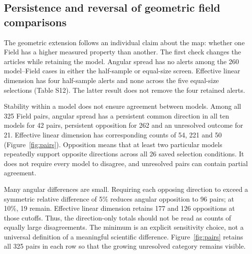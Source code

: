 \documentclass[12pt]{article}
\begin{document}
\subsection{Persistence and reversal of geometric field comparisons}
The geometric extension follows an individual claim about the map: whether one Field has a higher measured property than another. The first check changes the articles while retaining the model. Angular spread has no alerts among the 260 model--Field cases in either the half-sample or equal-size screen. Effective linear dimension has four half-sample alerts and none across the five equal-size selections (Table S12). The latter result does not remove the four retained alerts.

Stability within a model does not ensure agreement between models. Among all 325 Field pairs, angular spread has a persistent common direction in all ten models for 42 pairs, persistent opposition for 262 and an unresolved outcome for 21. Effective linear dimension has corresponding counts of 54, 221 and 50 (Figure~\ref{fig:pairs}). Opposition means that at least two particular models repeatedly support opposite directions across all 26 saved selection conditions. It does not require every model to disagree, and unresolved pairs can contain partial agreement.

Many angular differences are small. Requiring each opposing direction to exceed a symmetric relative difference of 5\% reduces angular opposition to 96 pairs; at 10\%, 19 remain. Effective linear dimension retains 177 and 126 oppositions at those cutoffs. Thus, the direction-only totals should not be read as counts of equally large disagreements. The minimum is an explicit sensitivity choice, not a universal definition of a meaningful scientific difference. Figure~\ref{fig:pairs} retains all 325 pairs in each row so that the growing unresolved category remains visible.

\end{document}
